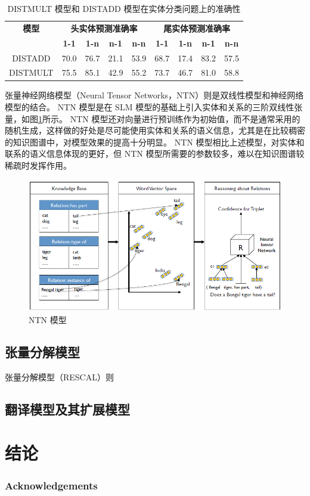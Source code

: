 \documentclass{llncs}
\begin{document}
\begin{table}
	\centering
	\caption{ DISTMULT 模型和 DISTADD 模型在实体分类问题上的准确性}
	\label{tb:DISTMULT&DISTADD}
	\begin{threeparttable}
		\begin{tabular}{ccccccccc}
			\hline
			\textbf{模型} & \multicolumn{4}{c}{\textbf{头实体预测准确率}} & \multicolumn{4}{c}{\textbf{尾实体预测准确率}} \\
			\textbf{} & \textbf{1-1} & \textbf{1-n} & \textbf{n-1} & \textbf{n-n} & \textbf{1-1} & \textbf{1-n} & \textbf{n-1} & \textbf{n-n} \\ \hline
			DISTADD & 70.0 & 76.7 & 21.1 & 53.9 & 68.7 & 17.4 & 83.2 & 57.5 \\
			DISTMULT & 75.5 & 85.1 & 42.9 & 55.2 & 73.7 & 46.7 & 81.0 & 58.8 \\ \hline
		\end{tabular}
	\end{threeparttable}
\end{table}

张量神经网络模型（Neural Tensor Networks，NTN）\cite{DBLP:conf/nips/SocherCMN13}则是双线性模型和神经网络模型的结合。 NTN 模型是在 SLM 模型的基础上引入实体和关系的三阶双线性张量，如图\ref{fg:NTN}所示。 NTN 模型还对向量进行预训练作为初始值，而不是通常采用的随机生成，这样做的好处是尽可能使用实体和关系的语义信息，尤其是在比较稠密的知识图谱中，对模型效果的提高十分明显。 NTN 模型相比上述模型，对实体和联系的语义信息体现的更好，但 NTN 模型所需要的参数较多，难以在知识图谱较稀疏时发挥作用。

\begin{figure}
	\centering
	\includegraphics[width=0.8\columnwidth]{figures/NTN.png}
	\caption{ NTN 模型}
	\label{fg:NTN}
\end{figure}

\subsection{张量分解模型}

张量分解模型（RESCAL）\cite{DBLP:conf/icml/NickelTK11}则

\subsection{翻译模型及其扩展模型}

\section{结论}

\subsubsection*{Acknowledgements}


%

	
\end{document}
